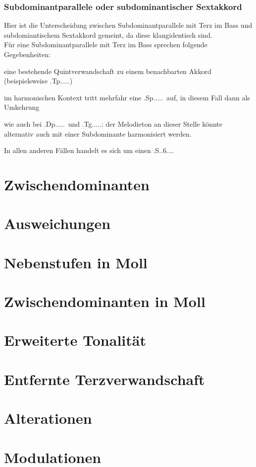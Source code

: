 \documentclass[a4paper]{article}
\newcommand{\Tp}{\HH.Tp.....}
\newcommand{\Tg}{\HH.Tg.....}
\newcommand{\Shoch}[2]{\HH.S.#2.#1...}
\newcommand{\Sp}{\HH.Sp.....}
\newcommand{\Dp}{\HH.Dp.....}
\begin{document}
	\subsubsection{Subdominantparallele oder subdominantischer Sextakkord}
	Hier ist die Unterscheidung zwischen Subdominantparallele mit Terz im Bass und subdomiantischem Sextakkord gemeint, da diese klangidentisch sind.\\
	Für eine Subdominantparallele mit Terz im Bass sprechen folgende Gegebenheiten:
	\begin{description}
		\item eine bestehende Quintverwandschaft zu einem benachbarten Akkord (beispielsweise \Tp)
		\item im harmonischen Kontext tritt mehrfahr eine \Sp\ auf, in diesem Fall dann als Umkehrung
		\item wie auch bei \Dp\ und \Tg: der Melodieton an dieser Stelle könnte alternativ auch mit einer Subdominante harmonisiert werden.
	\end{description}
	In allen anderen Fällen handelt es sich um einen \Shoch{6}{}.
	\section{Zwischendominanten}
	\section{Ausweichungen}
	\section{Nebenstufen in Moll}
	\section{Zwischendominanten in Moll}
	\section{Erweiterte Tonalität}
	\section{Entfernte Terzverwandschaft}
	\section{Alterationen}
	\section{Modulationen}
\end{document}
